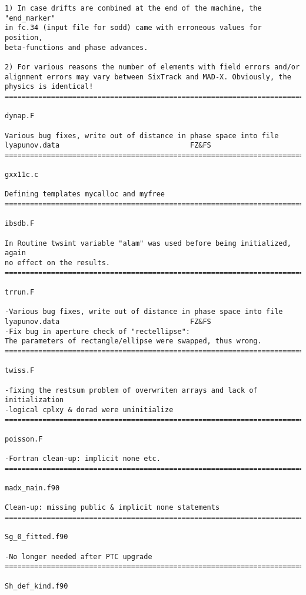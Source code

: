 \begin{verbatim}
1) In case drifts are combined at the end of the machine, the "end_marker"
in fc.34 (input file for sodd) came with erroneous values for position,
beta-functions and phase advances.

2) For various reasons the number of elements with field errors and/or
alignment errors may vary between SixTrack and MAD-X. Obviously, the
physics is identical!
=============================================================================

dynap.F

Various bug fixes, write out of distance in phase space into file
lyapunov.data                               FZ&FS
=============================================================================

gxx11c.c

Defining templates mycalloc and myfree
=============================================================================

ibsdb.F

In Routine twsint variable "alam" was used before being initialized, again
no effect on the results.
=============================================================================

trrun.F

-Various bug fixes, write out of distance in phase space into file
lyapunov.data                               FZ&FS
-Fix bug in aperture check of "rectellipse":
The parameters of rectangle/ellipse were swapped, thus wrong.
=============================================================================

twiss.F

-fixing the restsum problem of overwriten arrays and lack of initialization
-logical cplxy & dorad were uninitialize
=============================================================================

poisson.F

-Fortran clean-up: implicit none etc.
=============================================================================

madx_main.f90

Clean-up: missing public & implicit none statements
=============================================================================

Sg_0_fitted.f90

-No longer needed after PTC upgrade
=============================================================================

Sh_def_kind.f90


\end{verbatim}
